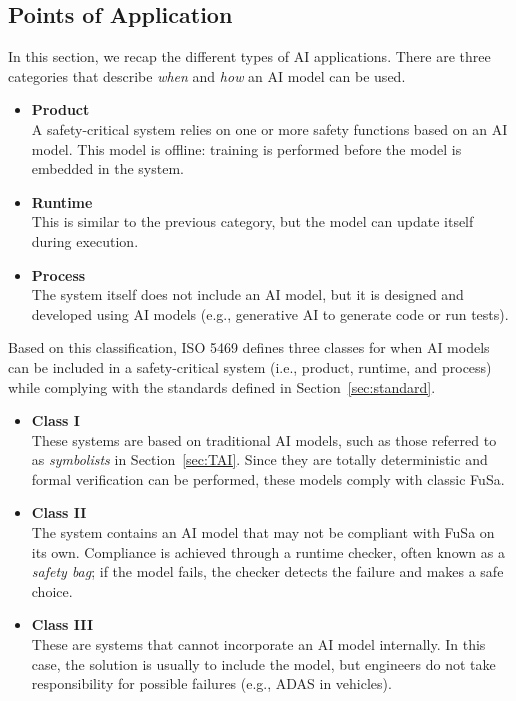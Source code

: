 \subsection{Points of Application}
\label{sec:application}
In this section, we recap the different types of AI applications. There are three categories that describe \textit{when} and \textit{how} an AI model can be used.
\begin{itemize}
    \item \textbf{Product} \\
        A safety-critical system relies on one or more safety functions based on an AI model. This model is offline: training is performed before the model is embedded in the system.
    \item \textbf{Runtime} \\
        This is similar to the previous category, but the model can update itself during execution.
    \item \textbf{Process} \\
        The system itself does not include an AI model, but it is designed and developed using AI models (e.g., generative AI to generate code or run tests).
\end{itemize}

\myskip

Based on this classification, ISO 5469 defines three classes for when AI models can be included in a safety-critical system (i.e., product, runtime, and process) while complying with the standards defined in Section~\ref{sec:standard}.
\begin{itemize}
    \item \textbf{Class I} \\
        These systems are based on traditional AI models, such as those referred to as \textit{symbolists} in Section~\ref{sec:TAI}. Since they are totally deterministic and formal verification can be performed, these models comply with classic FuSa.
    \item \textbf{Class II} \\
        The system contains an AI model that may not be compliant with FuSa on its own. Compliance is achieved through a runtime checker, often known as a \textit{safety bag}; if the model fails, the checker detects the failure and makes a safe choice.
    \item \textbf{Class III} \\
        These are systems that cannot incorporate an AI model internally. In this case, the solution is usually to include the model, but engineers do not take responsibility for possible failures (e.g., ADAS in vehicles).
\end{itemize}

